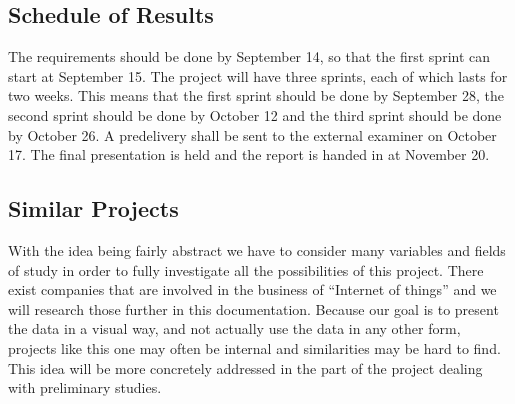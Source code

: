 \documentclass[../document.tex]{subfiles}
\begin{document}
\subsection{Schedule of Results}
The requirements should be done by September 14, so that the first sprint can start at September 15. The project will have three sprints, each of which lasts for two weeks. This means that the first sprint should be done by September 28, the second sprint should be done by October 12 and the third sprint should be done by October 26. A predelivery shall be sent to the external examiner on October 17. The final presentation is held and the report is handed in at November 20.

\subsection{Similar Projects}
With the idea being fairly abstract we have to consider many variables and fields of study in order to fully investigate all the possibilities of this project. There exist companies that are involved in the business of “Internet of things” and we will research those further in this documentation. Because our goal is to present the data in a visual way, and not actually use the data in any other form, projects like this one may often be internal and similarities may be hard to find. This idea will be more concretely addressed in the part of the project dealing with preliminary studies.
\end{document}
